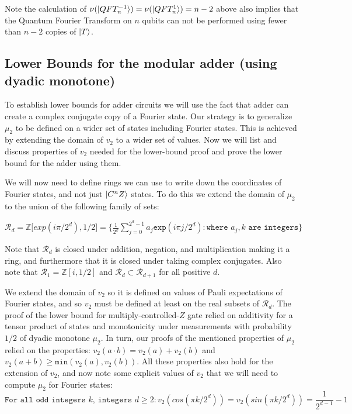 \documentclass[12pt]{dalthesis}
\begin{document}
Note the calculation of $\nu(\ket{QFT_n^{-1}}) = \nu(\ket{QFT_n^{1}}) = n-2$ above also implies that the Quantum Fourier Transform on $n$ qubits can not be performed using fewer than $n-2$ copies of $\ket{T}$.

\subsection{Lower Bounds for the modular adder (using dyadic monotone)}
To establish lower bounds for adder circuits we will use the fact that adder can create a complex conjugate copy of a Fourier state. Our strategy is to generalize $\mu_2$ to be defined on a wider set of states including Fourier states. This is achieved by extending the domain of $v_2$ to a wider set of values. Now we will list and discuss properties of $v_2$ needed for the lower-bound proof and prove the lower bound for the adder using them. 

We will now need to define rings we can use to write down the coordinates of Fourier states, and not just $\ket{C^nZ}$ states. To do this we extend the domain of $\mu_2$ to the union of the following family of sets:
\begin{center}
$\mathcal{R}_d = \mathbb{Z} \big[ exp(i\pi /2^d), 1/2 \big] = \Big\{ \frac{1}{2^k} \sum\limits_{j=0}^{2^d - 1} a_j \texttt{exp}(i\pi j/2^d): \texttt{where } a_j, k \texttt{ are integers} \Big\}$
\end{center}
Note that $\mathcal{R}_d$ is closed under addition, negation, and multiplication making it a ring, and furthermore that it is closed under taking complex conjugates. Also note that $\mathcal{R}_1 = \mathbb{Z}[i, 1/2]$ and $\mathcal{R}_d \subset \mathcal{R}_{d+1}$ for all positive $d$.

We extend the domain of $v_2$ so it is defined on values of Pauli expectations of Fourier states, and so $v_2$ must be defined at least on the real subsets of $\mathcal{R}_d$. The proof of the lower bound for multiply-controlled-$Z$ gate relied on additivity for a tensor product of states and monotonicity under measurements with probability $1/2$ of dyadic monotone $\mu_2$. In turn, our proofs of the mentioned properties of $\mu_2$ relied on the properties: $v_2(a \cdot b) = v_2(a) + v_2(b)$ and $v_2(a+b) \geq \texttt{min}(v_2(a), v_2(b))$. All these properties also hold for the extension of $v_2$, and now note some explicit values of $v_2$ that we will need to compute $\mu_2$ for Fourier states:
\begin{equation}
\texttt{For all odd integers } k \texttt{, integers } d \geq 2: v_2(cos(\pi k/2^d)) = v_2(sin(\pi k /2^d)) = \frac{1}{2^{d-1}} - 1
\end{equation}
\end{document}
